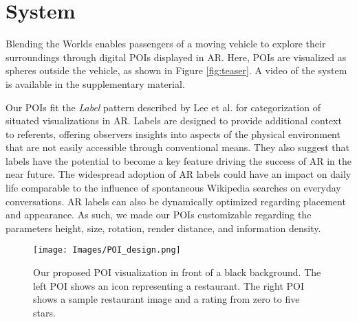 \section{System}
\label{sec:system}
Blending the Worlds enables passengers of a moving vehicle to explore their surroundings through digital POIs displayed in AR. Here, POIs are visualized as spheres outside the vehicle, as shown in Figure \ref{fig:teaser}. A video of the system is available in the supplementary material.

Our POIs fit the \textit{Label} pattern described by Lee et al. \cite{Lee24SituatedVisAR} for categorization of situated visualizations in AR. Labels are designed to provide additional context to referents, offering observers insights into aspects of the physical environment that are not easily accessible through conventional means. They also suggest that labels have the potential to become a key feature driving the success of AR in the near future. The widespread adoption of AR labels could have an impact on daily life comparable to the influence of spontaneous Wikipedia searches on everyday conversations. AR labels can also be dynamically optimized regarding placement and appearance. As such, we made our POIs customizable regarding the parameters height, size, rotation, render distance, and information density.

\begin{figure}[h]
    \centering
    \texttt{[image: Images/POI\_design.png]}
    \caption{Our proposed POI visualization in front of a black background. The left POI shows an icon representing a restaurant. The right POI shows a sample restaurant image and a rating from zero to five stars.}
    \label{fig:POI_Appearances}
\end{figure}


